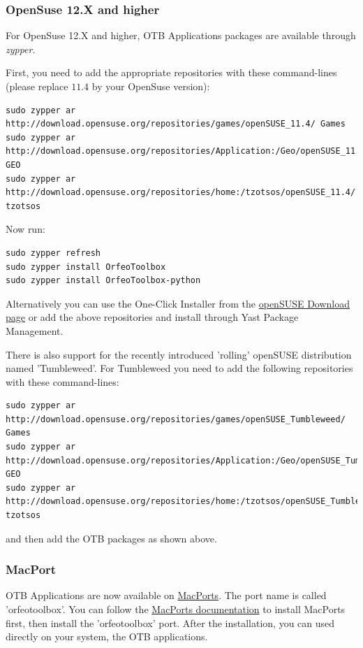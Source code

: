 \subsubsection{OpenSuse 12.X and higher}

For OpenSuse 12.X and higher, OTB Applications packages are available through
\emph{zypper}.

First, you need to add the appropriate repositories with these command-lines (please replace $11.4$ by your OpenSuse version):
\begin{verbatim}
sudo zypper ar
http://download.opensuse.org/repositories/games/openSUSE_11.4/ Games
sudo zypper ar
http://download.opensuse.org/repositories/Application:/Geo/openSUSE_11.4/ GEO
sudo zypper ar
http://download.opensuse.org/repositories/home:/tzotsos/openSUSE_11.4/ tzotsos
\end{verbatim}

Now run:
\begin{verbatim}
sudo zypper refresh
sudo zypper install OrfeoToolbox
sudo zypper install OrfeoToolbox-python
\end{verbatim}

Alternatively you can use the One-Click Installer from the \href{http://software.opensuse.org/search?q=Orfeo&baseproject=openSUSE\%3A11.4&lang=en&include_home=true&exclude_debug=true}{openSUSE Download page} or add the above repositories and install through Yast Package Management.

There is also support for the recently introduced 'rolling' openSUSE distribution named 'Tumbleweed'.
For Tumbleweed you need to add the following repositories with these command-lines:
\begin{verbatim}
sudo zypper ar
http://download.opensuse.org/repositories/games/openSUSE_Tumbleweed/ Games
sudo zypper ar
http://download.opensuse.org/repositories/Application:/Geo/openSUSE_Tumbleweed/ GEO
sudo zypper ar
http://download.opensuse.org/repositories/home:/tzotsos/openSUSE_Tumbleweed/ tzotsos
\end{verbatim}
and then add the OTB packages as shown above.

\subsubsection{MacPort}

OTB Applications are now available on \href{http://http://www.macports.org/}{MacPorts}.
The port name is called 'orfeotoolbox'.
You can follow the \href{ http://guide.macports.org/}{MacPorts documentation} to install MacPorts first, then install the 'orfeotoolbox' port.
After the installation, you can used directly on your system, the OTB applications.

